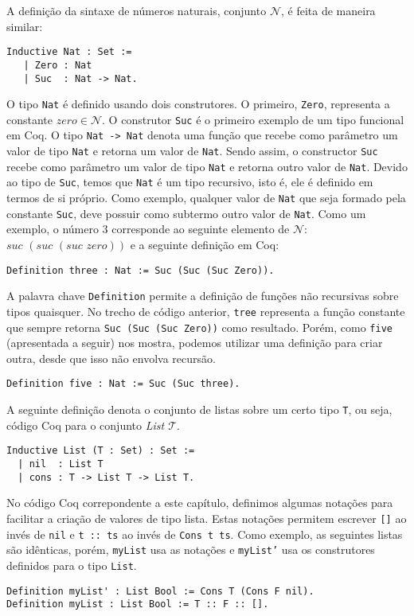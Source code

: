 A defini\c{c}\~ao da sintaxe de n\'umeros naturais, conjunto $\mathcal{N}$, \'e feita de maneira similar:
\begin{lstlisting}
Inductive Nat : Set :=
   | Zero : Nat
   | Suc  : Nat -> Nat.
\end{lstlisting}
O tipo \texttt{Nat} \'e definido usando dois construtores. O primeiro, \texttt{Zero}, representa a constante $zero\in\mathcal{N}$. O construtor
\texttt{Suc} \'e o primeiro exemplo de um tipo funcional em Coq. O tipo \texttt{Nat -> Nat} denota uma fun\c{c}\~ao que recebe como par\^ametro
um valor de tipo \texttt{Nat} e retorna um valor de \texttt{Nat}. Sendo assim, o constructor \texttt{Suc} recebe como par\^ametro um valor de
tipo \texttt{Nat} e retorna outro valor de \texttt{Nat}. Devido ao tipo de \texttt{Suc}, temos que \texttt{Nat} \'e um tipo recursivo, isto \'e,
ele \'e definido em termos de si pr\'oprio. Como exemplo, qualquer valor de \texttt{Nat} que seja formado pela constante \texttt{Suc}, deve
possuir como subtermo outro valor de \texttt{Nat}. Como um exemplo, o n\'umero $3$ corresponde
 ao seguinte elemento de $\mathcal{N}$: $suc\,\,(suc\,\,(suc\,\,zero))$ e a seguinte defini\c{c}\~ao em Coq:
\begin{lstlisting}
Definition three : Nat := Suc (Suc (Suc Zero)).
\end{lstlisting}
A palavra chave \texttt{Definition} permite a defini\c{c}\~ao de fun\c{c}\~oes n\~ao recursivas sobre tipos quaisquer. No trecho de c\'odigo
anterior, \texttt{tree} representa a fun\c{c}\~ao constante que sempre retorna \texttt{Suc (Suc (Suc Zero))} como resultado.
Por\'em, como \texttt{five} (apresentada a seguir) nos mostra, podemos utilizar uma defini\c{c}\~ao para criar outra, desde que isso 
n\~ao envolva recurs\~ao.
\begin{lstlisting}
Definition five : Nat := Suc (Suc three).
\end{lstlisting}

A seguinte defini\c{c}\~ao denota o conjunto de listas sobre um certo tipo \texttt{T}, ou seja, c\'odigo Coq para o conjunto 
\textit{List $\mathcal{T}$}. 
\begin{lstlisting}
Inductive List (T : Set) : Set :=
  | nil  : List T
  | cons : T -> List T -> List T.
\end{lstlisting}
No c\'odigo Coq correpondente a este cap\'itulo, definimos algumas nota\c{c}\~oes para facilitar a cria\c{c}\~ao de valores de tipo lista.
Estas nota\c{c}\~oes permitem escrever \texttt{[]} ao inv\'es de \texttt{nil} e \texttt{t :: ts} ao inv\'es de \texttt{Cons t ts}. Como
exemplo, as seguintes listas s\~ao id\^enticas, por\'em, \texttt{myList} usa as nota\c{c}\~oes e \texttt{myList'} usa os construtores
definidos para o tipo \texttt{List}.
\begin{lstlisting}
Definition myList' : List Bool := Cons T (Cons F nil).
Definition myList : List Bool := T :: F :: [].
\end{lstlisting}


